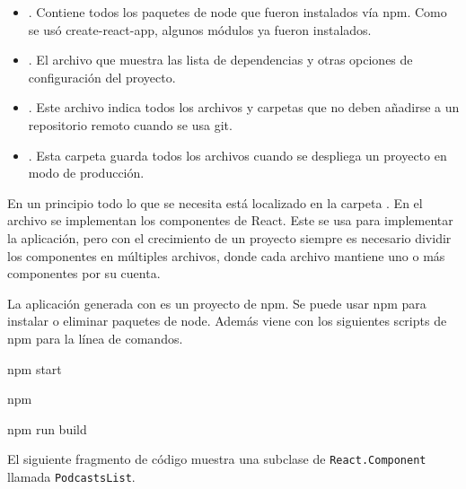 \begin{itemize}
\item {} 
. Contiene todos los paquetes de node que fueron instalados vía npm. Como se usó create-react-app, algunos módulos ya fueron instalados.

\item {} 
. El archivo que muestra las lista de dependencias y otras opciones de configuración del proyecto.

\item {} 
. Este archivo indica todos los archivos y carpetas que no deben añadirse a un repositorio remoto cuando se usa git.

\item {} 
. Esta carpeta guarda todos los archivos cuando se despliega un proyecto en modo de producción.

\end{itemize}

En un principio todo lo que se necesita está localizado en la carpeta .
En el archivo  se implementan los
componentes de React. Este se usa para implementar la aplicación, pero con el
crecimiento de un proyecto siempre es necesario dividir los componentes en
múltiples archivos, donde cada archivo mantiene uno o más componentes por
su cuenta.

La aplicación generada con  es un proyecto de npm. Se puede usar
npm para instalar o eliminar paquetes de node. Además viene con los siguientes
scripts de npm para la línea de comandos.

%
\begin{sphinxVerbatim}[commandchars=\\\{\}]
npm start

npm 

npm run build
\end{sphinxVerbatim}

El siguiente fragmento de código muestra una subclase
de \texttt{React.Component} llamada \texttt{PodcastsList}.


